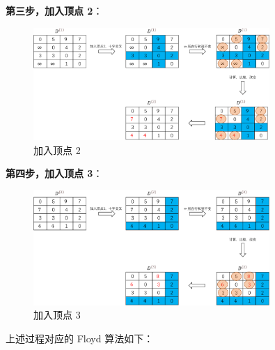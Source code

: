 \documentclass[lang=cn,newtx,10pt,scheme=chinese]{../elegantbook}
\begin{document}
\textbf{第三步，加入顶点 2}：

\begin{figure}[!htbp]
  \centering
  \includegraphics[width=0.8\textwidth]{./figure/pdf/cropped/floyd_addNum2.pdf}
  \caption{加入顶点 2}
  \label{fig:floyd_2}

\end{figure}

\textbf{第四步，加入顶点 3}：

\begin{figure}[!htbp]
  \centering
  \includegraphics[width=0.8\textwidth]{./figure/pdf/cropped/floyd_addNum3.pdf}
  \caption{加入顶点 3}
  \label{fig:floyd_3}

\end{figure}


上述过程对应的 Floyd 算法如下：
\end{document}
